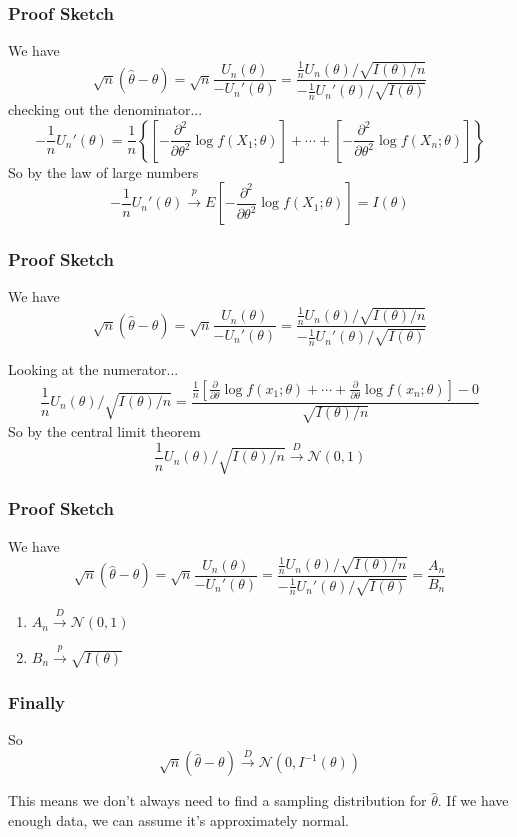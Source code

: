 \documentclass{beamer}
\begin{document}
\begin{frame}
\frametitle{Proof Sketch}
We have
\[
\sqrt{n}(\hat{\theta} - \theta) = \sqrt{n}\frac{U_n(\theta)}{- U_n'(\theta)} = \frac{\frac{1}{n}U_n(\theta) / \sqrt{I(\theta) / n} }{ -\frac{1}{n} U_n'(\theta) / \sqrt{I(\theta)}}
\]
checking out the denominator...
\[
-\frac{1}{n} U_n'(\theta) = \frac{1}{n} \left\{ \left[- \frac{\partial^2}{\partial\theta^2}\log f(X_1;\theta) \right] + \cdots + \left[- \frac{\partial^2}{\partial\theta^2}\log f(X_n;\theta) \right]  \right\} 
\]
So by the law of large numbers 
\[
-\frac{1}{n} U_n'(\theta) \overset{p}{\rightarrow} E\left[- \frac{\partial^2}{\partial\theta^2}\log f(X_1;\theta) \right] = I(\theta)
\]


\end{frame}


\begin{frame}
\frametitle{Proof Sketch}

We have
\[
\sqrt{n}(\hat{\theta} - \theta) = \sqrt{n}\frac{U_n(\theta)}{- U_n'(\theta)} = \frac{\frac{1}{n}U_n(\theta) / \sqrt{I(\theta) / n} }{ -\frac{1}{n} U_n'(\theta) / \sqrt{I(\theta)}}
\]

Looking at the numerator...
\[
\frac{1}{n} U_n(\theta)/ \sqrt{I(\theta)/n} = 
 \frac{
\frac{1}{n} \left[ \frac{\partial}{\partial\theta }\log f(x_1;\theta) + \cdots + \frac{\partial}{\partial\theta }\log f(x_n;\theta) \right] - 0 }{
\sqrt{I(\theta) /n}}
\]
So by the central limit theorem
\[
\frac{1}{n} U_n(\theta)/ \sqrt{I(\theta)/n}  \overset{D}{\rightarrow} \mathcal{N}(0,1)
\]
\end{frame}

\begin{frame}
\frametitle{Proof Sketch}

We have
\[
\sqrt{n}(\hat{\theta} - \theta) = \sqrt{n}\frac{U_n(\theta)}{- U_n'(\theta)} = \frac{\frac{1}{n}U_n(\theta) / \sqrt{I(\theta) / n} }{ -\frac{1}{n} U_n'(\theta) / \sqrt{I(\theta)}} = \frac{A_n}{B_n}
\]

\begin{enumerate}
\item $A_n \overset{D}{\rightarrow} \mathcal{N}(0,1)$
\item $B_n \overset{p}{\rightarrow} \sqrt{I(\theta)}$
\end{enumerate}

\end{frame}
\begin{frame}
\frametitle{Finally}

So 
\[
\sqrt{n}(\hat{\theta} - \theta) \overset{D}{\rightarrow} \mathcal{N}(0, I^{-1}(\theta))
\]

This means we don't always need to find a sampling distribution for $\hat{\theta}$. If we have enough data, we can assume it's approximately normal.
\end{frame}
\end{document}
